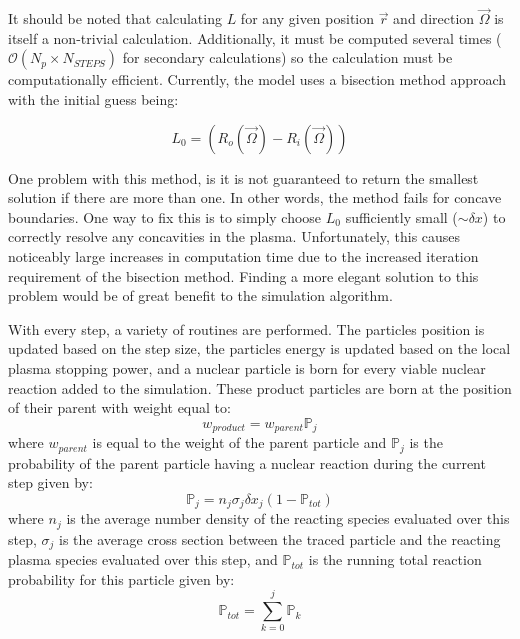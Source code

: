 	It should be noted that calculating $L$ for any given position $\vec{r}$ and direction $\vec{\Omega}$ is itself a non-trivial calculation. Additionally, it must be computed several times ($\mathcal{O}(N_p\times N_{STEPS})$ for secondary calculations) so the calculation must be computationally efficient. Currently, the model uses a bisection method approach with the initial guess being:
	
	\begin{equation}
		L_0=\left(R_o(\vec{\Omega}) - R_i(\vec{\Omega})\right)
	\end{equation}
	
	One problem with this method, is it is not guaranteed to return the smallest solution if there are more than one. In other words, the method fails for concave boundaries. One way to fix this is to simply choose $L_0$ sufficiently small ($\sim \delta x$) to correctly resolve any concavities in the plasma. Unfortunately, this causes noticeably large increases in computation time due to the increased iteration requirement of the bisection method. Finding a more elegant solution to this problem would be of great benefit to the simulation algorithm. 
	
	With every step, a variety of routines are performed. The particles position is updated based on the step size, the particles energy is updated based on the local plasma stopping power, and a nuclear particle is born for every viable nuclear reaction added to the simulation. These product particles are born at the position of their parent with weight equal to:
	\begin{equation}
		w_{product}=w_{parent} \mathbb{P}_{j}
	\end{equation}
	where $w_{parent}$ is equal to the weight of the parent particle and $\mathbb{P}_{j}$ is the probability of the parent particle having a nuclear reaction during the current step given by:
	\begin{equation}
		\mathbb{P}_{j} = n_{j} \sigma_{j} \delta x_j \left(1 - \mathbb{P}_{tot}\right)
	\end{equation}
	where $n_j$ is the average number density of the reacting species evaluated over this step, $\sigma_{j}$ is the average cross section between the traced particle and the reacting plasma species evaluated over this step, and $\mathbb{P}_{tot}$ is the running total reaction probability for this particle given by:
	\begin{equation}
		\mathbb{P}_{tot} = \sum_{k=0}^{j} \mathbb{P}_k
	\end{equation}

